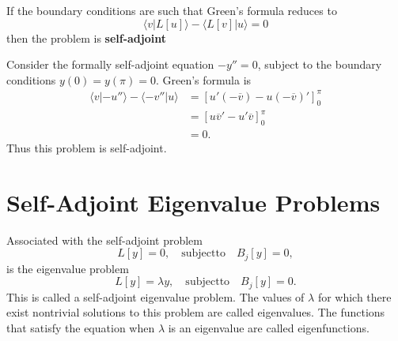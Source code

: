 If the boundary conditions are such that Green's formula reduces to
\[ \langle v | L[u] \rangle - \langle L[v]| u \rangle = 0\]
then the problem is \textbf{self-adjoint}



\begin{Example}
  Consider the formally self-adjoint equation $-y'' = 0$, subject to the boundary
  conditions $y(0) = y(\pi) = 0$.
  Green's formula is
  \begin{align*}
    \langle v | -u'' \rangle - \langle -v'' | u \rangle
    &= [u' (-\overline{v}) - u (- \overline{v})']_0^\pi \\
    &= [u\overline{v}' - u' \overline{v}]_0^\pi \\
    &= 0.
  \end{align*}
  Thus this problem is self-adjoint.
\end{Example}




















\section{Self-Adjoint Eigenvalue Problems}

Associated with the self-adjoint problem
\[ 
L[y] = 0, \quad \mathrm{subject to} \quad B_j[y] = 0,
\]
is the eigenvalue problem
\[ 
L[y] = \lambda y, \quad \mathrm{subject to} \quad B_j[y] = 0.
\]
This is called a self-adjoint eigenvalue problem. 
The values of $\lambda$ for which there exist nontrivial solutions to
this problem are called eigenvalues.  The functions that satisfy the equation
when $\lambda$ is an eigenvalue are called eigenfunctions.






